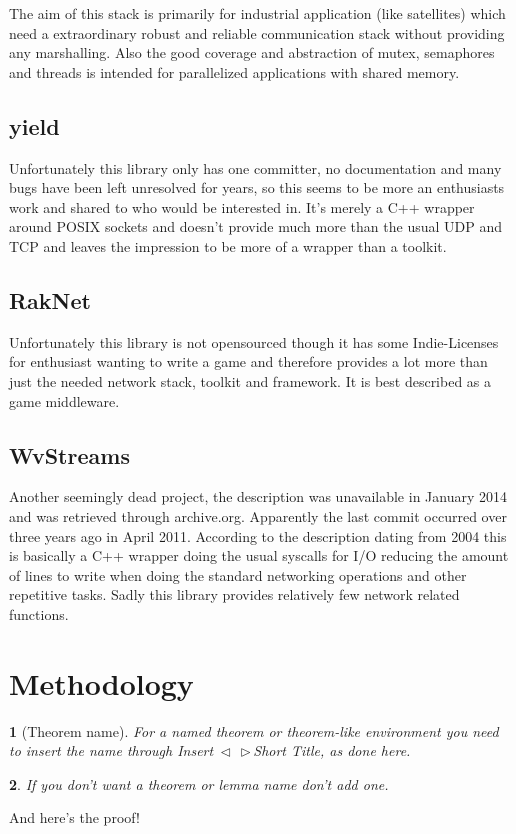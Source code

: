 \documentclass[twocolumn,english]{IEEEtran}
\makeatletter
\DeclareRobustCommand*{\lyxarrow}{%
\@ifstar
{\leavevmode\,$\triangleleft$\,\allowbreak}
{\leavevmode\,$\triangleright$\,\allowbreak}}
\theoremstyle{plain}
\newtheorem{thm}{\protect\theoremname}
\theoremstyle{plain}
\newtheorem{lem}[thm]{\protect\lemmaname}
\providecommand{\lemmaname}{Lemma}
\providecommand{\theoremname}{Theorem}
\makeatother
\begin{document}
The aim of this stack is primarily for industrial application (like
satellites) which need a extraordinary robust and reliable communication stack
without providing any marshalling. Also the good coverage and abstraction of
mutex, semaphores and threads is intended for parallelized applications with
shared memory.

\subsection{yield\cite{yield}} 
Unfortunately this library only has one committer, no documentation and many
bugs have been left unresolved for years, so this seems to be more an
enthusiasts work and shared to who would be interested in. It's merely a C++
wrapper around POSIX sockets and doesn't provide much more than the usual UDP
and TCP and leaves the impression to be more of a wrapper than a toolkit.

\subsection{RakNet\cite{raknet}}
Unfortunately this library is not opensourced though it has some
Indie-Licenses for enthusiast wanting to write a game and therefore provides a
lot more than just the needed network stack, toolkit and framework. It is best
described as a game middleware.

\subsection{WvStreams\cite{wvstreams}}
Another seemingly dead project, the description was unavailable in January
2014 and was retrieved through archive.org. Apparently the last commit
occurred over three years ago in April 2011. According to the description
dating from 2004 this is basically a C++ wrapper doing the usual syscalls for
I/O reducing the amount of lines to write when doing the standard networking
operations and other repetitive tasks. Sadly this library provides relatively
few network related functions.

\section{Methodology}
\begin{thm}[Theorem name]
For a named theorem or theorem-like environment you need to insert
the name through \textsf{Insert\lyxarrow{}Short Title}, as done here.\end{thm}
\begin{lem}
If you don't want a theorem or lemma name don't add one.\end{lem}
\begin{IEEEproof}
And here's the proof!
\end{IEEEproof}
\end{document}
